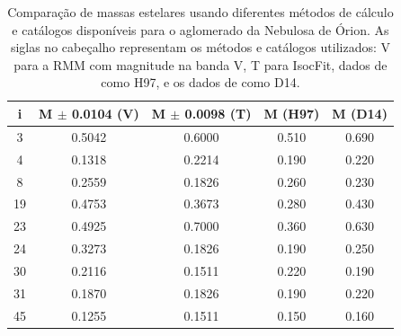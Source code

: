 \begin{table}[htbp]
	\centering
	\caption[Resultados de massas estelares para ONC]{Comparação de massas estelares usando diferentes métodos de cálculo e catálogos disponíveis para o aglomerado da Nebulosa de Órion. As siglas no cabeçalho representam os métodos e catálogos utilizados: V para a RMM com magnitude na banda V, T para IsocFit, dados de  como H97, e os dados de   como D14.}
	\label{tab:onc_massas}
	\begin{tabular}{ccccc}
		\hline
		{i} & {M $\pm$ 0.0104 (V)} & {M $\pm$ 0.0098 (T)} & {M (H97)} & {M (D14)}\\ \hline
		3   & 0.5042 & 0.6000 & 0.510 & 0.690 \\
		4   & 0.1318 & 0.2214 & 0.190 & 0.220 \\
		8   & 0.2559 & 0.1826 & 0.260 & 0.230 \\
		19  & 0.4753 & 0.3673 & 0.280 & 0.430 \\
		23  & 0.4925 & 0.7000 & 0.360 & 0.630 \\
		24  & 0.3273 & 0.1826 & 0.190 & 0.250 \\
		30  & 0.2116 & 0.1511 & 0.220 & 0.190 \\
		31  & 0.1870 & 0.1826 & 0.190 & 0.220 \\
		45  & 0.1255 & 0.1511 & 0.150 & 0.160 \\
		\hline
	\end{tabular}
\end{table}
